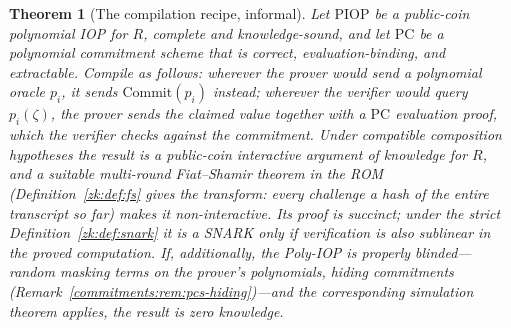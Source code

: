 \documentclass[11pt,a4paper]{article}
\newtheorem{theorem}{Theorem}[section]
\theoremstyle{definition}
\theoremstyle{remark}
\begin{document}
\begin{theorem}[The compilation recipe, informal]\label{zk:thm:recipe}
Let \(\mathrm{PIOP}\) be a public-coin polynomial IOP for \(R\),
complete and knowledge-sound, and let \(\mathrm{PC}\) be a
polynomial commitment scheme that is correct, evaluation-binding,
and extractable. Compile as follows: wherever the prover would send
a polynomial oracle \(p_i\), it sends
\(\mathrm{Commit}(p_i)\) instead; wherever the verifier would query
\(p_i(\zeta)\), the prover sends the claimed value together with a
\(\mathrm{PC}\) evaluation proof, which the verifier checks against
the commitment. Under compatible composition hypotheses the result
is a public-coin interactive argument of knowledge for \(R\), and a
suitable multi-round Fiat--Shamir theorem in the ROM
(Definition~\ref{zk:def:fs} gives the transform: every challenge a
hash of the entire transcript so far) makes it non-interactive. Its
proof is succinct; under the strict Definition~\ref{zk:def:snark}
it is a SNARK only if verification is also sublinear in the proved
computation. If, additionally, the Poly-IOP is properly
blinded---random masking terms on the prover's polynomials, hiding
commitments (Remark~\ref{commitments:rem:pcs-hiding})---and the
corresponding simulation theorem applies, the result is zero
knowledge.
\end{theorem}
\end{document}
